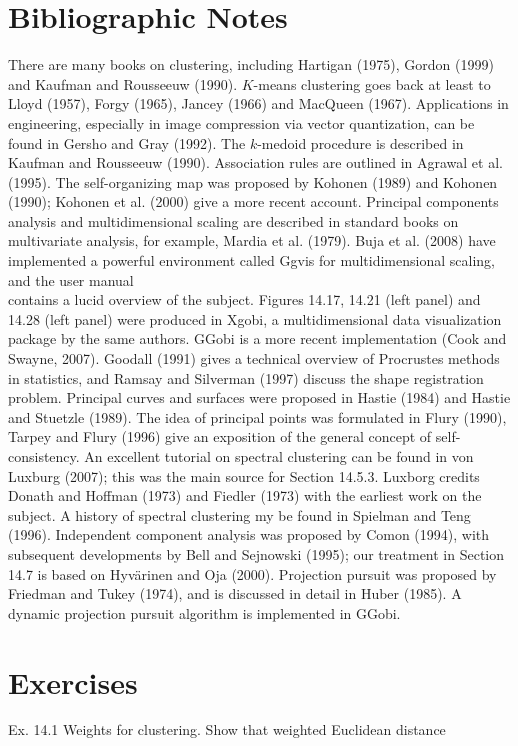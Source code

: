 \documentclass[10pt]{article}
\begin{document}
\section*{Bibliographic Notes}
There are many books on clustering, including Hartigan (1975), Gordon (1999) and Kaufman and Rousseeuw (1990). $K$-means clustering goes back at least to Lloyd (1957), Forgy (1965), Jancey (1966) and MacQueen (1967). Applications in engineering, especially in image compression via vector quantization, can be found in Gersho and Gray (1992). The $k$-medoid procedure is described in Kaufman and Rousseeuw (1990). Association rules are outlined in Agrawal et al. (1995). The self-organizing map was proposed by Kohonen (1989) and Kohonen (1990); Kohonen et al. (2000) give a more recent account. Principal components analysis and multidimensional scaling are described in standard books on multivariate analysis, for example, Mardia et al. (1979). Buja et al. (2008) have implemented a powerful environment called Ggvis for multidimensional scaling, and the user manual\\
contains a lucid overview of the subject. Figures 14.17, 14.21 (left panel) and 14.28 (left panel) were produced in Xgobi, a multidimensional data visualization package by the same authors. GGobi is a more recent implementation (Cook and Swayne, 2007). Goodall (1991) gives a technical overview of Procrustes methods in statistics, and Ramsay and Silverman (1997) discuss the shape registration problem. Principal curves and surfaces were proposed in Hastie (1984) and Hastie and Stuetzle (1989). The idea of principal points was formulated in Flury (1990), Tarpey and Flury (1996) give an exposition of the general concept of self-consistency. An excellent tutorial on spectral clustering can be found in von Luxburg (2007); this was the main source for Section 14.5.3. Luxborg credits Donath and Hoffman (1973) and Fiedler (1973) with the earliest work on the subject. A history of spectral clustering my be found in Spielman and Teng (1996). Independent component analysis was proposed by Comon (1994), with subsequent developments by Bell and Sejnowski (1995); our treatment in Section 14.7 is based on Hyvärinen and Oja (2000). Projection pursuit was proposed by Friedman and Tukey (1974), and is discussed in detail in Huber (1985). A dynamic projection pursuit algorithm is implemented in GGobi.

\section*{Exercises}
Ex. 14.1 Weights for clustering. Show that weighted Euclidean distance
\end{document}
